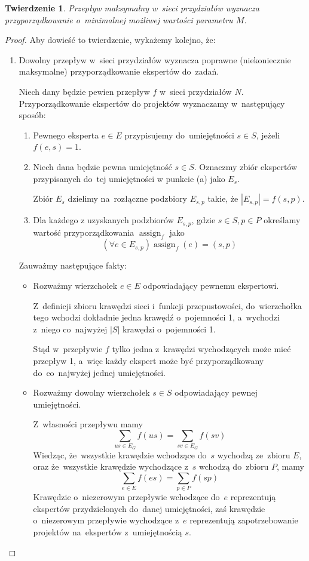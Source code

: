 \documentclass[12pt,a4paper]{article}
\newtheorem{thm}{Twierdzenie}
\theoremstyle{definition}
\DeclareMathOperator{\assign}{assign}
\begin{document}
\begin{thm}
Przepływ maksymalny w~sieci przydziałów wyznacza przyporządkowanie o~minimalnej
możliwej wartości parametru $M$. 
\end{thm}

\begin{proof}
Aby dowieść to twierdzenie, wykażemy kolejno, że:
\begin{enumerate}
	\item Dowolny przepływ w~sieci przydziałów wyznacza poprawne (niekoniecznie
	maksymalne) przyporządkowanie ekspertów do~zadań.
	
	Niech dany będzie pewien przepływ $f$ w~sieci przydziałów $N$.
	Przyporządkowanie ekspertów do projektów wyznaczamy w~następujący sposób:
	\begin{enumerate}
		\item Pewnego eksperta $e \in E$ przypisujemy do~umiejętności $s \in S$,
		jeżeli $f(e,s) = 1$.
		\item Niech dana będzie pewna umiejętność $s \in S$. Oznaczmy zbiór
		ekspertów przypisanych do~tej umiejętności w punkcie (a) jako $E_s$.

		Zbiór $E_s$ dzielimy na~rozłączne podzbiory $E_{s,p}$ takie, że
		$|E_{s,p}| = f(s,p)$.
		\item Dla każdego z uzyskanych podzbiorów $E_{s,p}$, gdzie
		$s \in S, p \in P$ określamy wartość przyporządkowania $\assign_f$ jako
		$$ (\forall e \in E_{s,p}) \assign_f(e) = (s,p) $$

	\end{enumerate}
	Zauważmy następujące fakty:
	\begin{itemize}
		\item Rozważmy wierzchołek $e \in E$ odpowiadający pewnemu ekspertowi.
		
		Z~definicji zbioru krawędzi sieci i~funkcji przepustowości,
		do~wierzchołka tego wchodzi dokładnie jedna krawędź o~pojemności 1,
		a~wychodzi z~niego co~najwyżej $|S|$ krawędzi o~pojemności 1.

		Stąd w~przepływie $f$ tylko jedna z~krawędzi wychodzących może mieć
		przepływ 1, a~więc każdy ekspert może być przyporządkowany
		do~co~najwyżej jednej umiejętności.
		\item Rozważmy dowolny wierzchołek $s \in S$ odpowiadający pewnej
		umiejętności.

		Z~własności przepływu mamy
		$$ \sum_{us \in E_G} f(us) = \sum_{sv \in E_G} f(sv) $$
		Wiedząc, że~wszystkie krawędzie wchodzące do~$s$ wychodzą ze~zbioru $E$,
		oraz że~wszystkie krawędzie wychodzące z~$s$ wchodzą do~zbioru $P$, mamy
		$$ \sum_{e \in E} f(es) = \sum_{p \in P} f(sp) $$
		Krawędzie o~niezerowym przepływie wchodzące do~$e$ reprezentują
		ekspertów przydzielonych do~danej umiejętności, zaś krawędzie
		o~niezerowym przepływie wychodzące z~$e$ reprezentują zapotrzebowanie
		projektów na~ekspertów z~umiejętnością $s$.


\end{itemize}
\end{enumerate}
\end{proof}
\end{document}
